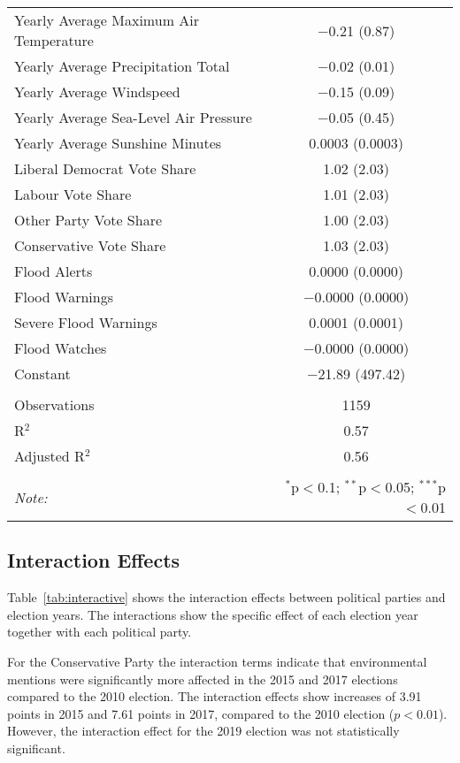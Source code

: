 \documentclass[12pt,letterpaper]{article}
\begin{document}
\begin{table}[!htbp]
\begin{tabular}{@{\extracolsep{5pt}}lc}
		Yearly Average Maximum Air Temperature & $-$0.21 (0.87) \\ 
		Yearly Average Precipitation Total & $-$0.02 (0.01) \\ 
		Yearly Average Windspeed & $-$0.15 (0.09) \\ 
		Yearly Average  Sea-Level Air Pressure & $-$0.05 (0.45) \\ 
		Yearly Average Sunshine Minutes & 0.0003 (0.0003) \\ 
		Liberal Democrat Vote Share & 1.02 (2.03) \\ 
		Labour Vote Share & 1.01 (2.03) \\ 
		Other Party Vote Share & 1.00 (2.03) \\ 
		Conservative Vote Share & 1.03 (2.03) \\ 
		Flood Alerts & 0.0000 (0.0000) \\ 
		Flood Warnings & $-$0.0000 (0.0000) \\ 
		Severe Flood Warnings & 0.0001 (0.0001) \\ 
		Flood Watches & $-$0.0000 (0.0000) \\ 
		Constant & $-$21.89 (497.42) \\ 
		\hline \\[-1.8ex] 
		Observations & 1159 \\ 
		R$^{2}$ & 0.57 \\ 
		Adjusted R$^{2}$ & 0.56 \\ 
		\hline 
		\hline \\[-1.8ex] 
		\textit{Note:}  & \multicolumn{1}{r}{$^{*}$p$<$0.1; $^{**}$p$<$0.05; $^{***}$p$<$0.01} \\ 
	\end{tabular} 
\end{table} 

\newpage

\pagestyle{plain}

\subsection{Interaction Effects}

Table~\ref{tab:interactive} shows the interaction effects between political parties and election years. The interactions show the specific effect of each election year together with each political party. 

For the Conservative Party the interaction terms indicate that environmental mentions were significantly more affected in the 2015 and 2017 elections compared to the 2010 election. The interaction effects show increases of 3.91 points in 2015 and 7.61 points in 2017, compared to the 2010 election ($p<0.01$). However, the interaction effect for the 2019 election was not statistically significant.
\end{document}

